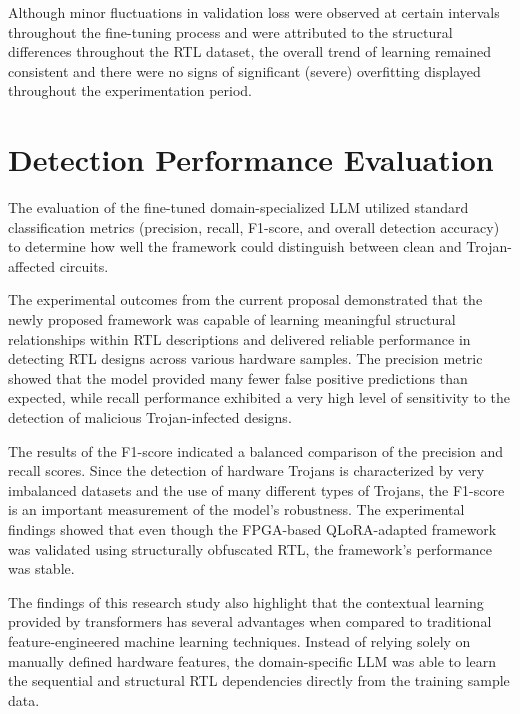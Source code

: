 \documentclass[12pt,a4paper]{report}
\begin{document}
Although minor fluctuations in validation loss were observed at certain intervals throughout the fine-tuning process and were attributed to the structural differences throughout the RTL dataset, the overall trend of learning remained consistent and there were no signs of significant (severe) overfitting displayed throughout the experimentation period.


\section{Detection Performance Evaluation}

The evaluation of the fine-tuned domain-specialized LLM utilized standard classification metrics (precision, recall, F1-score, and overall detection accuracy) to determine how well the framework could distinguish between clean and Trojan-affected circuits.

The experimental outcomes from the current proposal demonstrated that the newly proposed framework was capable of learning meaningful structural relationships within RTL descriptions and delivered reliable performance in detecting RTL designs across various hardware samples. The precision metric showed that the model provided many fewer false positive predictions than expected, while recall performance exhibited a very high level of sensitivity to the detection of malicious Trojan-infected designs.

The results of the F1-score indicated a balanced comparison of the precision and recall scores. Since the detection of hardware Trojans is characterized by very imbalanced datasets and the use of many different types of Trojans, the F1-score is an important measurement of the model's robustness. The experimental findings showed that even though the FPGA-based QLoRA-adapted framework was validated using structurally obfuscated RTL, the framework's performance was stable.

The findings of this research study also highlight that the contextual learning provided by transformers has several advantages when compared to traditional feature-engineered machine learning techniques. Instead of relying solely on manually defined hardware features, the domain-specific LLM was able to learn the sequential and structural RTL dependencies directly from the training sample data.

\end{document}

